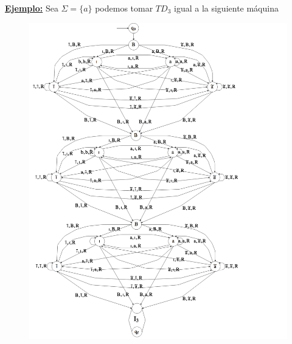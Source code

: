 \begin{frame}
  \PN \underline{\textbf{Ejemplo:}} Sea $\Sigma = \{a\}$ podemos tomar $TD_{3}$ igual a la siguiente máquina
  \begin{figure}[h]
    \centering
    \includegraphics[scale=0.125]{graphics/figure_3.png}
  \end{figure}
\end{frame}
